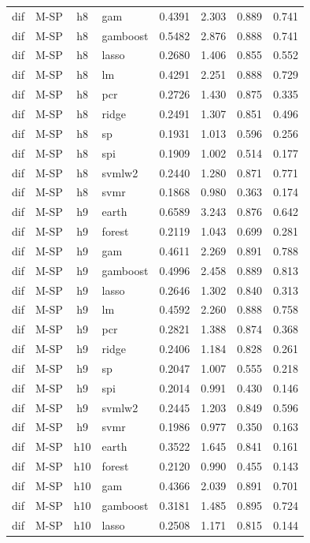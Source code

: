 \begin{ThreePartTable}
\begin{longtable}[t]{llclcccc}
dif & M-SP & h8 & gam & 0.4391 & 2.303 & 0.889 & 0.741\\
dif & M-SP & h8 & gamboost & 0.5482 & 2.876 & 0.888 & 0.741\\
dif & M-SP & h8 & lasso & 0.2680 & 1.406 & 0.855 & 0.552\\
dif & M-SP & h8 & lm & 0.4291 & 2.251 & 0.888 & 0.729\\
dif & M-SP & h8 & pcr & 0.2726 & 1.430 & 0.875 & 0.335\\
dif & M-SP & h8 & ridge & 0.2491 & 1.307 & 0.851 & 0.496\\
dif & M-SP & h8 & sp & 0.1931 & 1.013 & 0.596 & 0.256\\
dif & M-SP & h8 & spi & 0.1909 & 1.002 & 0.514 & 0.177\\
dif & M-SP & h8 & svmlw2 & 0.2440 & 1.280 & 0.871 & 0.771\\
dif & M-SP & h8 & svmr & 0.1868 & 0.980 & 0.363 & 0.174\\
\addlinespace
dif & M-SP & h9 & earth & 0.6589 & 3.243 & 0.876 & 0.642\\
dif & M-SP & h9 & forest & 0.2119 & 1.043 & 0.699 & 0.281\\
dif & M-SP & h9 & gam & 0.4611 & 2.269 & 0.891 & 0.788\\
dif & M-SP & h9 & gamboost & 0.4996 & 2.458 & 0.889 & 0.813\\
dif & M-SP & h9 & lasso & 0.2646 & 1.302 & 0.840 & 0.313\\
dif & M-SP & h9 & lm & 0.4592 & 2.260 & 0.888 & 0.758\\
dif & M-SP & h9 & pcr & 0.2821 & 1.388 & 0.874 & 0.368\\
dif & M-SP & h9 & ridge & 0.2406 & 1.184 & 0.828 & 0.261\\
dif & M-SP & h9 & sp & 0.2047 & 1.007 & 0.555 & 0.218\\
dif & M-SP & h9 & spi & 0.2014 & 0.991 & 0.430 & 0.146\\
dif & M-SP & h9 & svmlw2 & 0.2445 & 1.203 & 0.849 & 0.596\\
dif & M-SP & h9 & svmr & 0.1986 & 0.977 & 0.350 & 0.163\\
\addlinespace
dif & M-SP & h10 & earth & 0.3522 & 1.645 & 0.841 & 0.161\\
dif & M-SP & h10 & forest & 0.2120 & 0.990 & 0.455 & 0.143\\
dif & M-SP & h10 & gam & 0.4366 & 2.039 & 0.891 & 0.701\\
dif & M-SP & h10 & gamboost & 0.3181 & 1.485 & 0.895 & 0.724\\
dif & M-SP & h10 & lasso & 0.2508 & 1.171 & 0.815 & 0.144\\

\end{longtable}
\end{ThreePartTable}
